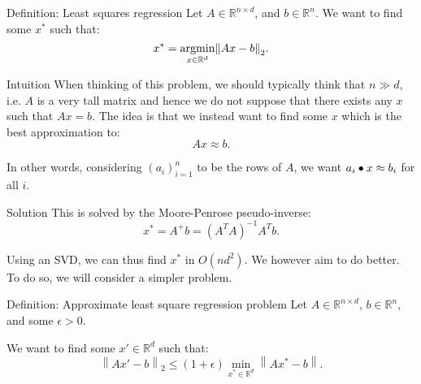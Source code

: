 \documentclass[a4paper]{article}
\begin{document}
\begin{parag}{Definition: Least squares regression}
    Let $A \in \mathbb{R}^{n \times d}$, and $b \in \mathbb{R}^n$. We want to find some $x^*$ such that: 
    \[x^* = \argmin_{x \in \mathbb{R}^d} \left\|A x - b\right\|_2.\]
    
    \begin{subparag}{Intuition}
        When thinking of this problem, we should typically think that $n \gg d$, i.e. $A$ is a very tall matrix and hence we do not suppose that there exists any $x$ such that $A x = b$. The idea is that we instead want to find some $x$ which is the best approximation to: 
        \[Ax \approx b.\]

        In other words, considering $\left(a_i\right)_{i = 1}^n$ to be the rows of $A$, we want $a_i \bullet x \approx b_i$ for all $i$.
    \end{subparag}

    \begin{subparag}{Solution}
         This is solved by the Moore-Penrose pseudo-inverse: 
         \[x^* = A^+ b = \left(A^T A\right)^{-1} A^T b.\]
         
         Using an SVD, we can thus find $x^*$ in $O\left(n d^2\right)$. We however aim to do better. To do so, we will consider a simpler problem.
    \end{subparag}
\end{parag}

\begin{parag}{Definition: Approximate least square regression problem}
    Let $A \in \mathbb{R}^{n \times d}$, $b \in \mathbb{R}^n$, and some $\epsilon > 0$.

    We want to find some $x' \in \mathbb{R}^d$ such that: 
    \[\left\|A x' - b\right\|_2 \leq \left(1 + \epsilon\right) \min_{x^* \in \mathbb{R}^d} \left\|A x^* - b\right\|.\]
\end{parag}
\end{document}
